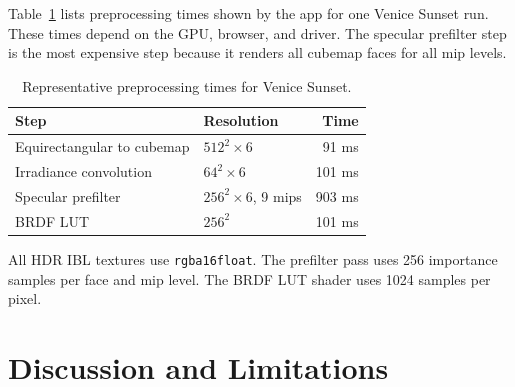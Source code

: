 \documentclass{egpubl}
\begin{document}
\begin{table}[tb]
    \centering
    \caption{Representative rendering performance from the stats panel.}
    \label{tab:renderperf}
\end{table}

Table~\ref{tab:preprocess} lists preprocessing times shown by the app for one Venice Sunset run.
These times depend on the GPU, browser, and driver.
The specular prefilter step is the most expensive step because it renders all cubemap faces for all mip levels.

\begin{table}[tb]
    \centering
    \caption{Representative preprocessing times for Venice Sunset.}
    \label{tab:preprocess}
    \begin{tabular}{llr}
        \toprule
        Step                       & Resolution               & Time   \\
        \midrule
        Equirectangular to cubemap & $512^2 \times 6$         & 91 ms  \\
        Irradiance convolution     & $64^2 \times 6$          & 101 ms \\
        Specular prefilter         & $256^2 \times 6$, 9 mips & 903 ms \\
        BRDF LUT                   & $256^2$                  & 101 ms \\
        \bottomrule
    \end{tabular}
\end{table}

All HDR IBL textures use \texttt{rgba16float}.
The prefilter pass uses 256 importance samples per face and mip level.
The BRDF LUT shader uses 1024 samples per pixel.

\section{Discussion and Limitations}
\end{document}
